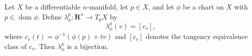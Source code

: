 Let $X$ be a differentiable $n$-manifold, let $p \in X$, and let $\phi$ be a chart on $X$ with $p \in \operatorname{dom} \phi$. Define $\lambda_\phi^p \colon \mathbf{R}^n \to T_p X$ by
$$
\lambda_\phi^p(v) = [c_v],
$$
where $c_v(t) = \phi^{-1}(\phi(p) + tv)$ and $[c_v]$ denotes the tangency equivalence class of $c_v$. Then $\lambda_\phi^p$ is a bijection.
